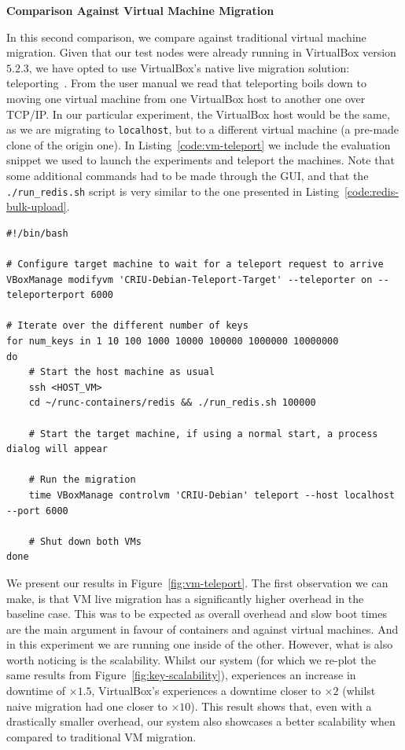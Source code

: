 \textbf{Comparison Against Virtual Machine Migration}

In this second comparison, we compare against traditional virtual machine migration.
Given that our test nodes were already running in VirtualBox version $5.2.3$, we have opted to use VirtualBox's native live migration solution: teleporting~\cite{vbox-teleport}.
From the user manual we read that teleporting boils down to moving one virtual machine from one VirtualBox host to another one over TCP/IP.
In our particular experiment, the VirtualBox  host would be the same, as we are migrating to \texttt{localhost}, but to a different virtual machine (a pre-made clone of the origin one).
In Listing~\ref{code:vm-teleport} we include the evaluation snippet we used to launch the experiments and teleport the machines.
Note that some additional commands had to be made through the GUI, and that the \texttt{./run\_redis.sh} script is very similar to the one presented in Listing~\ref{code:redis-bulk-upload}.

\begin{lstlisting}[style=Bash,caption={Script to teleport a VirtualBox VM, and run the macrobenchmark.},label={code:vm-teleport}]
#!/bin/bash

# Configure target machine to wait for a teleport request to arrive
VBoxManage modifyvm 'CRIU-Debian-Teleport-Target' --teleporter on --teleporterport 6000

# Iterate over the different number of keys
for num_keys in 1 10 100 1000 10000 100000 1000000 10000000
do
    # Start the host machine as usual
    ssh <HOST_VM>
    cd ~/runc-containers/redis && ./run_redis.sh 100000

    # Start the target machine, if using a normal start, a process dialog will appear

    # Run the migration
    time VBoxManage controlvm 'CRIU-Debian' teleport --host localhost --port 6000

    # Shut down both VMs
done
\end{lstlisting}

We present our results in Figure~\ref{fig:vm-teleport}.
The first observation we can make, is that VM live migration has a significantly higher overhead in the baseline case.
This was to be expected as overall overhead and slow boot times are the main argument in favour of containers and against virtual machines.
And in this experiment we are running one inside of the other.
However, what is also worth noticing is the scalability.
Whilst our system (for which we re-plot the same results from Figure~\ref{fig:key-scalability}), experiences an increase in downtime of $\times 1.5$, VirtualBox's experiences a downtime closer to $\times 2$ (whilst naive migration had one closer to $\times 10$).
This result shows that, even with a drastically smaller overhead, our system also showcases a better scalability when compared to traditional VM migration.

